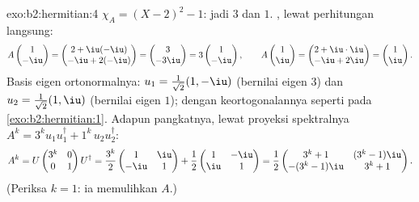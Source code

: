 \begin{solution}{exo:b2:hermitian:4}
$\chi_A = (X-2)^2 - 1$: jadi  $3$ dan $1$. , lewat
perhitungan langsung:
\[
A\begin{pmatrix}1\\ -\iu\end{pmatrix}
= \begin{pmatrix} 2 + \iu(-\iu)\\ -\iu + 2(-\iu)\end{pmatrix}
= \begin{pmatrix} 3\\ -3\iu \end{pmatrix}
= 3\begin{pmatrix}1\\ -\iu\end{pmatrix},
\qquad
A\begin{pmatrix}1\\ \iu\end{pmatrix}
= \begin{pmatrix} 2 + \iu\cdot\iu\\ -\iu + 2\iu\end{pmatrix}
= \begin{pmatrix}1\\ \iu\end{pmatrix}.
\]
Basis eigen ortonormalnya: $u_1 = \frac{1}{\sqrt2}(1, -\iu)$
(bernilai eigen $3$) dan $u_2 = \frac{1}{\sqrt2}(1, \iu)$ (bernilai eigen
$1$); dengan keortogonalannya seperti pada \cref{exo:b2:hermitian:1}. Adapun pangkatnya,
lewat proyeksi spektralnya $A^k = 3^k u_1u_1^\dagger + 1^k\,
u_2u_2^\dagger$:
\[
A^k = U\begin{pmatrix} 3^k & 0\\ 0 & 1\end{pmatrix}U^\dagger
= \frac{3^k}{2}\begin{pmatrix} 1 & \iu\\ -\iu & 1\end{pmatrix}
+ \frac{1}{2}\begin{pmatrix} 1 & -\iu\\ \iu & 1\end{pmatrix}
= \frac12\begin{pmatrix}
3^k + 1 & (3^k - 1)\iu\\
-(3^k-1)\iu & 3^k + 1
\end{pmatrix}.
\]
(Periksa $k = 1$: ia memulihkan $A$.)
\end{solution}

